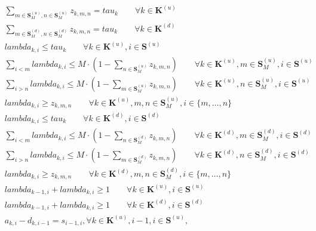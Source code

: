 \begin{align}
  & \sum_{m \in \mathbf{S}_{M}^{(u)}, n \in \mathbf{S}_{M}^{(u)}} z_{k,m,n} = tau_{k} \qquad \forall k \in \mathbf{K}^{(u)} \tag{eq\_0001} \\
  & \sum_{m \in \mathbf{S}_{M}^{(d)}, n \in \mathbf{S}_{M}^{(d)}} z_{k,m,n} = tau_{k} \qquad \forall k \in \mathbf{K}^{(d)} \tag{eq\_0002} \\
  & \mathit{lambda}_{k,i} \leq tau_{k} \qquad \forall k \in \mathbf{K}^{(u)}, i \in \mathbf{S}^{(u)} \tag{eq\_0003} \\
  & \sum_{i < m} \mathit{lambda}_{k,i} \leq M \cdot (1 - \sum_{n \in \mathbf{S}_{M}^{(u)}} z_{k,m,n}) \qquad \forall k \in \mathbf{K}^{(u)}, m \in \mathbf{S}_{M}^{(u)}, i \in \mathbf{S}^{(u)} \tag{eq\_0004} \\
  & \sum_{i > n} \mathit{lambda}_{k,i} \leq M \cdot (1 - \sum_{m \in \mathbf{S}_{M}^{(u)}} z_{k,m,n}) \qquad \forall k \in \mathbf{K}^{(u)}, n \in \mathbf{S}_{M}^{(u)}, i \in \mathbf{S}^{(u)} \tag{eq\_0005} \\
  & \mathit{lambda}_{k,i} \geq z_{k,m,n} \qquad \forall k \in \mathbf{K}^{(u)}, m,n \in \mathbf{S}_{M}^{(u)}, i \in \{m,\ldots,n\} \tag{eq\_0006} \\
  & \mathit{lambda}_{k,i} \leq tau_{k} \qquad \forall k \in \mathbf{K}^{(d)}, i \in \mathbf{S}^{(d)} \tag{eq\_0007} \\
  & \sum_{i < m} \mathit{lambda}_{k,i} \leq M \cdot (1 - \sum_{n \in \mathbf{S}_{M}^{(d)}} z_{k,m,n}) \qquad \forall k \in \mathbf{K}^{(d)}, m \in \mathbf{S}_{M}^{(d)}, i \in \mathbf{S}^{(d)} \tag{eq\_0008} \\
  & \sum_{i > n} \mathit{lambda}_{k,i} \leq M \cdot (1 - \sum_{m \in \mathbf{S}_{M}^{(d)}} z_{k,m,n}) \qquad \forall k \in \mathbf{K}^{(d)}, n \in \mathbf{S}_{M}^{(d)}, i \in \mathbf{S}^{(d)} \tag{eq\_0009} \\
  & \mathit{lambda}_{k,i} \geq z_{k,m,n} \qquad \forall k \in \mathbf{K}^{(d)}, m,n \in \mathbf{S}_{M}^{(d)}, i \in \{m,\ldots,n\} \tag{eq\_0010} \\
  & \mathit{lambda}_{k-1,i} + \mathit{lambda}_{k,i} \geq 1 \qquad \forall k \in \mathbf{K}^{(u)}, i \in \mathbf{S}^{(u)} \tag{eq\_0011} \\
  & \mathit{lambda}_{k-1,i} + \mathit{lambda}_{k,i} \geq 1 \qquad \forall k \in \mathbf{K}^{(d)}, i \in \mathbf{S}^{(d)} \tag{eq\_0012} \\
  & a_{k , i} - d_{k , i - 1} = s_{i - 1 , i} , \forall k \in \mathbf{K}^{\left(u\right)} , i - 1 , i \in \mathbf{S}^{\left(u\right)} , \tag{eq\_0013} \\

\end{align}
